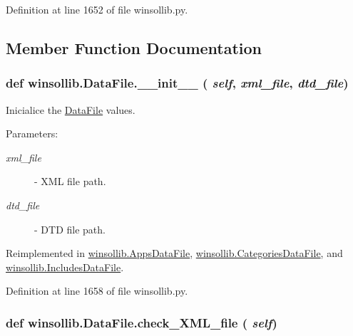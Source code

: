 Definition at line 1652 of file winsollib.py.

\subsection{Member Function Documentation}
\hypertarget{classwinsollib_1_1DataFile_22c2b3c07b3991b6c2300719eccd9687}{
\subsubsection[\_\-\_\-init\_\-\_\-]{\setlength{\rightskip}{0pt plus 5cm}def winsollib.Data\-File.\_\-\_\-init\_\-\_\- ( {\em self},  {\em xml\_\-file},  {\em dtd\_\-file})}}
\label{classwinsollib_1_1DataFile_22c2b3c07b3991b6c2300719eccd9687}


Inicialice the \hyperlink{classwinsollib_1_1DataFile}{Data\-File} values. 

\begin{Desc}
\item[Parameters:]
\begin{description}
\item[{\em xml\_\-file}]- XML file path. \item[{\em dtd\_\-file}]- DTD file path. \end{description}
\end{Desc}


Reimplemented in \hyperlink{classwinsollib_1_1AppsDataFile_c1fe263619352c8a85a48a3ba16a60e2}{winsollib.Apps\-Data\-File}, \hyperlink{classwinsollib_1_1CategoriesDataFile_cd08ce6d213ed244d0c27fc9af77bceb}{winsollib.Categories\-Data\-File}, and \hyperlink{classwinsollib_1_1IncludesDataFile_64deea7da911c3fb099dee54eb1f6cf9}{winsollib.Includes\-Data\-File}.

Definition at line 1658 of file winsollib.py.\hypertarget{classwinsollib_1_1DataFile_9526df0d51f57fade5dbe0b541fc5da4}{
\subsubsection[check\_\-XML\_\-file]{\setlength{\rightskip}{0pt plus 5cm}def winsollib.Data\-File.check\_\-XML\_\-file ( {\em self})}}
\label{classwinsollib_1_1DataFile_9526df0d51f57fade5dbe0b541fc5da4}


